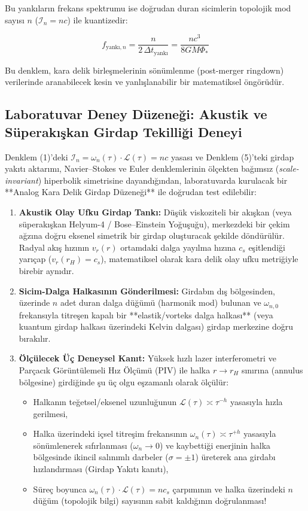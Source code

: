 \documentclass[12pt,a4paper]{article}
\begin{document}
Bu yankıların frekans spektrumu ise doğrudan duran sicimlerin topolojik mod sayısı $n$ ($\mathcal{I}_n = n c$) ile kuantizedir:

\begin{equation}
f_{\text{yankı}, n} = \frac{n}{2 \, \Delta t_{\text{yankı}}} = \frac{n c^3}{8 G M \Phi_*}
\end{equation}

Bu denklem, kara delik birleşmelerinin sönümlenme (post-merger ringdown) verilerinde aranabilecek kesin ve yanlışlanabilir bir matematiksel öngörüdür.

\subsection{Laboratuvar Deney Düzeneği: Akustik ve Süperakışkan Girdap Tekilliği Deneyi}

Denklem (1)'deki $\mathcal{I}_n = \omega_n(\tau) \cdot \mathcal{L}(\tau) = n c$ yasası ve Denklem (5)'teki girdap yakıtı aktarımı, Navier--Stokes ve Euler denklemlerinin ölçekten bağımsız (\textit{scale-invariant}) hiperbolik simetrisine dayandığından, laboratuvarda kurulacak bir **Analog Kara Delik Girdap Düzeneği** ile doğrudan test edilebilir:

\begin{enumerate}
    \item \textbf{Akustik Olay Ufku Girdap Tankı:} Düşük viskoziteli bir akışkan (veya süperakışkan Helyum-4 / Bose--Einstein Yoğuşuğu), merkezdeki bir çekim ağzına doğru eksenel simetrik bir girdap oluşturacak şekilde döndürülür. Radyal akış hızının $v_r(r)$ ortamdaki dalga yayılma hızına $c_s$ eşitlendiği yarıçap ($v_r(r_H) = c_s$), matematiksel olarak kara delik olay ufku metriğiyle birebir aynıdır.
    \item \textbf{Sicim-Dalga Halkasının Gönderilmesi:} Girdabın dış bölgesinden, üzerinde $n$ adet duran dalga düğümü (harmonik mod) bulunan ve $\omega_{n,0}$ frekansıyla titreşen kapalı bir **elastik/vorteks dalga halkası** (veya kuantum girdap halkası üzerindeki Kelvin dalgası) girdap merkezine doğru bırakılır.
    \item \textbf{Ölçülecek Üç Deneysel Kanıt:} Yüksek hızlı lazer interferometri ve Parçacık Görüntülemeli Hız Ölçümü (PIV) ile halka $r \to r_H$ sınırına (annulus bölgesine) girdiğinde şu üç olgu eşzamanlı olarak ölçülür:
    \begin{itemize}
        \item Halkanın teğetsel/eksenel uzunluğunun $\mathcal{L}(\tau) \asymp \tau^{-h}$ yasasıyla hızla gerilmesi,
        \item Halka üzerindeki içsel titreşim frekansının $\omega_n(\tau) \asymp \tau^{+h}$ yasasıyla sönümlenerek sıfırlanması ($\omega_n \to 0$) ve kaybettiği enerjinin halka bölgesinde ikincil salınımlı darbeler ($\sigma = \pm 1$) üreterek ana girdabı hızlandırması (Girdap Yakıtı kanıtı),
        \item Süreç boyunca $\omega_n(\tau) \cdot \mathcal{L}(\tau) = n c_s$ çarpımının ve halka üzerindeki $n$ düğüm (topolojik bilgi) sayısının sabit kaldığının doğrulanması!
    \end{itemize}
\end{enumerate}
\end{document}
